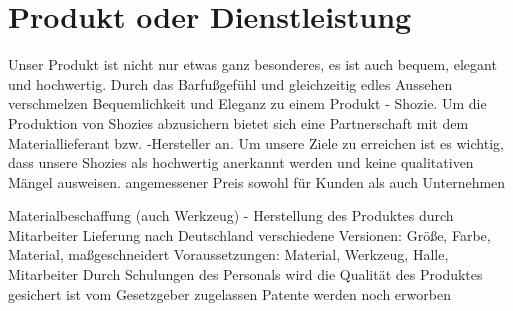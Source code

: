 \chapter{Produkt oder Dienstleistung}
\label{cha:3}
Unser Produkt ist nicht nur etwas ganz besonderes, es ist auch bequem, elegant und hochwertig.
Durch das Barfußgefühl und gleichzeitig edles Aussehen verschmelzen Bequemlichkeit und Eleganz zu einem Produkt - Shozie.
Um die Produktion von Shozies abzusichern bietet sich eine Partnerschaft mit dem Materiallieferant bzw. -Hersteller an.
Um unsere Ziele zu erreichen ist es wichtig, dass unsere Shozies als hochwertig anerkannt werden und keine qualitativen Mängel ausweisen.
angemessener Preis sowohl für Kunden als auch Unternehmen

Materialbeschaffung (auch Werkzeug) - Herstellung des Produktes durch Mitarbeiter
Lieferung nach Deutschland
verschiedene Versionen: Größe, Farbe, Material, maßgeschneidert
Voraussetzungen: Material, Werkzeug, Halle, Mitarbeiter
Durch Schulungen  des Personals wird die Qualität des Produktes gesichert
ist vom Gesetzgeber zugelassen
Patente werden noch erworben